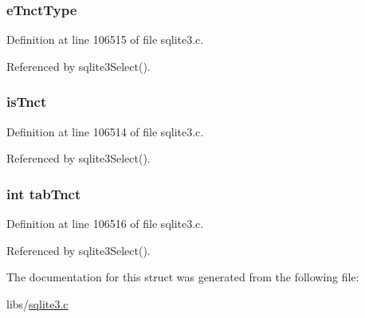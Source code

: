 \subsubsection[{e\+Tnct\+Type}]{ e\+Tnct\+Type}\label{struct_distinct_ctx_a8adafa81d3bc292d68ffdf215e0faf3d}


Definition at line 106515 of file sqlite3.\+c.



Referenced by sqlite3\+Select().

\hypertarget{struct_distinct_ctx_a93b6b04a410193e5e5060a7c67ebddcc}{}
\subsubsection[{is\+Tnct}]{ is\+Tnct}\label{struct_distinct_ctx_a93b6b04a410193e5e5060a7c67ebddcc}


Definition at line 106514 of file sqlite3.\+c.



Referenced by sqlite3\+Select().

\hypertarget{struct_distinct_ctx_a25dcb2aebcd55046aef6458b549f2d5c}{}
\subsubsection[{tab\+Tnct}]{\setlength{\rightskip}{0pt plus 5cm}int tab\+Tnct}\label{struct_distinct_ctx_a25dcb2aebcd55046aef6458b549f2d5c}


Definition at line 106516 of file sqlite3.\+c.



Referenced by sqlite3\+Select().



The documentation for this struct was generated from the following file\+:\begin{DoxyCompactItemize}
\item 
libs/\hyperlink{sqlite3_8c}{sqlite3.\+c}\end{DoxyCompactItemize}

